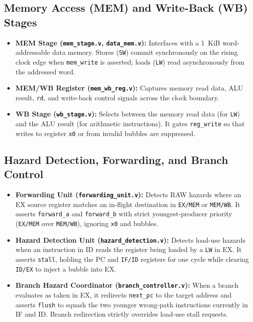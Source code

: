 \documentclass[conference]{IEEEtran}
\begin{document}
\subsection{Memory Access (MEM) and Write-Back (WB) Stages}
\begin{itemize}
    \item \textbf{MEM Stage (\texttt{mem\_stage.v}, \texttt{data\_mem.v}):} Interfaces with a 1~KiB word-addressable data memory. Stores (\texttt{SW}) commit synchronously on the rising clock edge when \texttt{mem\_write} is asserted; loads (\texttt{LW}) read asynchronously from the addressed word.
    \item \textbf{MEM/WB Register (\texttt{mem\_wb\_reg.v}):} Captures memory read data, ALU result, \texttt{rd}, and write-back control signals across the clock boundary.
    \item \textbf{WB Stage (\texttt{wb\_stage.v}):} Selects between the memory read data (for \texttt{LW}) and the ALU result (for arithmetic instructions). It gates \texttt{reg\_write} so that writes to register \texttt{x0} or from invalid bubbles are suppressed.
\end{itemize}

\subsection{Hazard Detection, Forwarding, and Branch Control}
\begin{itemize}
    \item \textbf{Forwarding Unit (\texttt{forwarding\_unit.v}):} Detects RAW hazards where an EX source register matches an in-flight destination in \texttt{EX/MEM} or \texttt{MEM/WB}. It asserts \texttt{forward\_a} and \texttt{forward\_b} with strict youngest-producer priority (\texttt{EX/MEM} over \texttt{MEM/WB}), ignoring \texttt{x0} and bubbles.
    \item \textbf{Hazard Detection Unit (\texttt{hazard\_detection.v}):} Detects load-use hazards when an instruction in ID reads the register being loaded by a \texttt{LW} in EX. It asserts \texttt{stall}, holding the PC and \texttt{IF/ID} registers for one cycle while clearing \texttt{ID/EX} to inject a bubble into EX.
    \item \textbf{Branch Hazard Coordinator (\texttt{branch\_controller.v}):} When a branch evaluates as taken in EX, it redirects \texttt{next\_pc} to the target address and asserts \texttt{flush} to squash the two younger wrong-path instructions currently in IF and ID. Branch redirection strictly overrides load-use stall requests.
\end{itemize}
\end{document}
